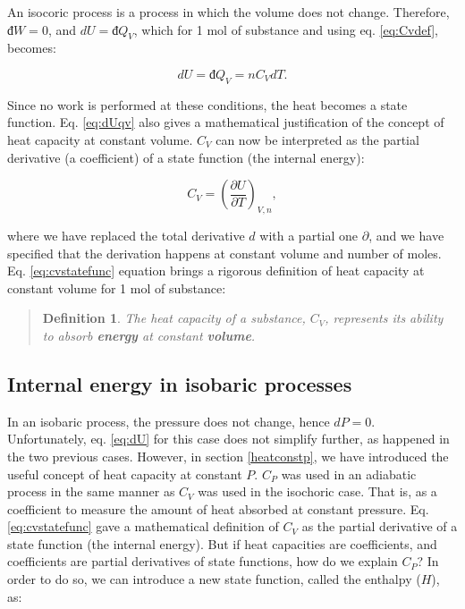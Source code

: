 \documentclass[
  9pt,
]{extbook}
\theoremstyle{definition}
\newtheorem{definition}{Definition}[chapter]
\theoremstyle{definition}
\theoremstyle{definition}
\theoremstyle{remark}
\begin{document}
An isocoric process is a process in which the volume does not change. Therefore, \(đ W=0\), and \(dU = đ Q_V\), which for 1 mol of substance and using eq. \eqref{eq:Cvdef}, becomes:

\begin{equation}
  dU = đ Q_V = n C_V dT.
  \label{eq:dUqv}
\end{equation}

Since no work is performed at these conditions, the heat becomes a state function. Eq. \eqref{eq:dUqv} also gives a mathematical justification of the concept of heat capacity at constant volume. \(C_V\) can now be interpreted as the partial derivative (a coefficient) of a state function (the internal energy):

\begin{equation}
  C_V = \left( \frac{\partial U} {\partial T} \right)_{V,n},
  \label{eq:cvstatefunc}
\end{equation}

where we have replaced the total derivative \(d\) with a partial one \(\partial\), and we have specified that the derivation happens at constant volume and number of moles. Eq. \eqref{eq:cvstatefunc} equation brings a rigorous definition of heat capacity at constant volume for 1 mol of substance:

\begin{quote}
\begin{definition}
\protect\hypertarget{def:newdefcv}{}{\label{def:newdefcv} }\emph{The heat capacity of a substance, \(C_V\), represents its ability to absorb \textbf{energy} at constant \textbf{volume}.}
\end{definition}
\end{quote}

\hypertarget{enthalpy}{%
\subsection{Internal energy in isobaric processes}\label{enthalpy}}

In an isobaric process, the pressure does not change, hence \(dP=0\). Unfortunately, eq. \eqref{eq:dU} for this case does not simplify further, as happened in the two previous cases. However, in section \ref{heatconstp}, we have introduced the useful concept of heat capacity at constant \(P\). \(C_P\) was used in an adiabatic process in the same manner as \(C_V\) was used in the isochoric case. That is, as a coefficient to measure the amount of heat absorbed at constant pressure. Eq. \eqref{eq:cvstatefunc} gave a mathematical definition of \(C_V\) as the partial derivative of a state function (the internal energy). But if heat capacities are coefficients, and coefficients are partial derivatives of state functions, how do we explain \(C_P\)? In order to do so, we can introduce a new state function, called the enthalpy (\(H\)), as:
\end{document}
